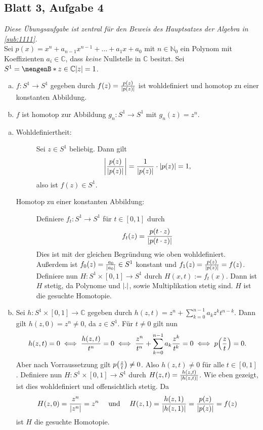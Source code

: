 \subsection[Blatt3, Aufgabe 4: Hilfssatz für den Hauptsatz der Algebra]{Blatt 3, Aufgabe 4} %
\label{sub:B3A4}
\emph{Diese Übungsaufgabe ist zentral für den Beweis des Hauptsatzes der Algebra in \ref{sub:1111}.} \smallskip \\
Sei $p(x)= x^n + a_{n-1} x^{n-1} + \ldots + a_1 x + a_0$ mit $n \in \mathds{N}_0$ ein Polynom mit Koeffizienten $a_i \in \mathds{C}$, dass \emph{keine} Nullstelle in 
$\mathds{C}$ besitzt. Sei $S^1= \set[z \in \mathds{C}]{\abs*{z}=1}$.
\begin{enumerate}[(a)]
	\item $f : S^1 \to S^1$ gegeben durch $f(z) = \frac{p(z)}{\abs*{p(z)} } $ ist wohldefiniert und homotop zu einer konstanten Abbildung.
	\item $f$ ist homotop zur Abbildung $g_n : S^1 \to S^1$ mit $g_n(z)= z^n$.
\end{enumerate}
\begin{enumerate}[(a)]
	\item \begin{description}
		\item[Wohldefiniertheit:] Sei $z \in S^1$ beliebig. Dann gilt
		\[
			\abs*{\frac{p(z)}{\abs*{p(z)} } } = \frac{1}{\abs*{p(z)} } \cdot \abs*{p(z)} =1,
		\]
		also ist $f(z) \in S^1$.
		\item[Homotop zu einer konstanten Abbildung:] Definiere $f_t : S^1 \to S^1$ für $t \in [0,1]$ durch 
		\[
			f_t(z) = \frac{p(t \cdot z)}{\abs*{p(t \cdot z)} } 
		\]
		Dies ist mit der gleichen Begründung wie oben wohldefiniert. Außerdem ist $f_0(z)= \frac{a_0}{\abs*{a_0} } \in S^1 $ konstant und 
		$f_1(z)= \frac{p(z)}{\abs*{p(z)} }=f(z)$. Definiere nun $H : S^1 \times [0,1] \to S^1$ durch $H(x,t) := f_t(x)$. Dann ist $H$ stetig, da Polynome und $\abs*{.} $, sowie
		Multiplikation stetig sind. $H$ ist die gesuchte Homotopie.
	\end{description}
	\item Sei $h : S^1 \times [0,1] \to \mathds{C}$ gegeben durch $h(z,t) = z^n + \sum_{k=0}^{n-1} a_k z^k t^{n-k}$. Dann gilt $h(z,0)=z^n \not= 0$, da $z \in S^1$.
	Für $t \not= 0$ gilt nun
	\begin{align*}
		h(z,t) = 0 \iff \frac{h(z,t)}{t^n} = 0 \iff \frac{z^n}{t^n} + \sum_{k=0}^{n-1} a_k \frac{z^k}{t^k} = 0 \iff p \enbrace*{\frac{z}{t}} = 0 .
	\end{align*}
	Aber nach Vorraussetzung gilt $p \enbrace*{\frac{z}{t}} \not= 0$. Also $h(z,t) \not= 0$ für alle $t \in [0,1]$. Definiere nun $H : S^1 \times [0,1]\to S^1$ durch
	$H(z,t) = \frac{h(z,t)}{\abs*{h(z,t)}}$. Wie eben gezeigt, ist dies wohldefiniert und offensichtlich stetig. Da
	\[
		H(z,0) = \frac{z^n}{\abs*{z^n} } = z^n \quad \text{ und } \quad H(z,1) = \frac{h(z,1)}{\abs*{h(z,1)} } = \frac{p(z)}{\abs*{p(z)} } =f(z)
	\]
	ist $H$ die gesuchte Homotopie. \bewende
\end{enumerate}

